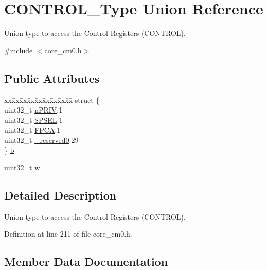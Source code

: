 \hypertarget{union_c_o_n_t_r_o_l___type}{}\section{C\+O\+N\+T\+R\+O\+L\+\_\+\+Type Union Reference}
\label{union_c_o_n_t_r_o_l___type}


Union type to access the Control Registers (C\+O\+N\+T\+R\+OL).  




{\ttfamily \#include $<$core\+\_\+cm0.\+h$>$}

\subsection*{Public Attributes}
\begin{DoxyCompactItemize}
\item 
\begin{tabbing}
xx\=xx\=xx\=xx\=xx\=xx\=xx\=xx\=xx\=\kill
struct \{\\
\>uint32\_t \hyperlink{union_c_o_n_t_r_o_l___type_a35c1732cf153b7b5c4bd321cf1de9605}{nPRIV}:1\\
\>uint32\_t \hyperlink{union_c_o_n_t_r_o_l___type_a8cc085fea1c50a8bd9adea63931ee8e2}{SPSEL}:1\\
\>uint32\_t \hyperlink{union_c_o_n_t_r_o_l___type_ac62cfff08e6f055e0101785bad7094cd}{FPCA}:1\\
\>uint32\_t \hyperlink{union_c_o_n_t_r_o_l___type_af8c314273a1e4970a5671bd7f8184f50}{\_reserved0}:29\\
\} \hyperlink{union_c_o_n_t_r_o_l___type_adc6a38ab2980d0e9577b5a871da14eb9}{b}\\

\end{tabbing}\item 
uint32\+\_\+t \hyperlink{union_c_o_n_t_r_o_l___type_a6b642cca3d96da660b1198c133ca2a1f}{w}
\end{DoxyCompactItemize}


\subsection{Detailed Description}
Union type to access the Control Registers (C\+O\+N\+T\+R\+OL). 

Definition at line 211 of file core\+\_\+cm0.\+h.



\subsection{Member Data Documentation}
